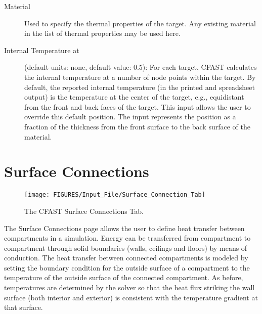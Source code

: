 \begin{description}
\item[Material] Used to specify the thermal properties of the target.  Any existing material in the list of thermal properties may be used here.

\item[Internal Temperature at] (default units: none, default value: 0.5): For each target, CFAST calculates the internal temperature at a number of node points within the target. By default, the reported internal temperature (in the printed and spreadsheet output) is the temperature at the center of the target, e.g., equidistant from the front and back faces of the target. This input allows the user to override this default position. The input represents the position as a fraction of the thickness from the front surface to the back surface of the material.
\end{description}






\chapter{Surface Connections}

\begin{figure}[h!]
\begin{center}
\texttt{[image: FIGURES/Input\_File/Surface\_Connection\_Tab]}
\caption[The CFAST Surface Connections Tab]{The CFAST Surface Connections Tab.}
\end{center}
\end{figure}

The Surface Connections page allows the user to define heat transfer between compartments in a simulation. Energy can be transferred from compartment to compartment through solid boundaries (walls, ceilings and floors) by means of conduction. The heat transfer between connected compartments is modeled by setting the boundary condition for the outside surface of a compartment to the temperature of the outside surface of the  connected compartment.   As before, temperatures are determined by the solver so that the heat flux striking the wall surface (both interior and exterior) is consistent with the temperature gradient at that surface.

